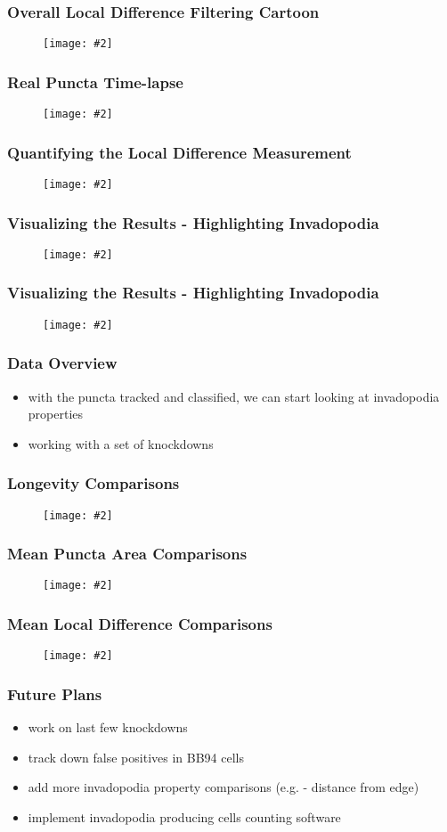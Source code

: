 \documentclass{beamer}
\newcommand{\centerfig}[3]{
	\begin{center}
	\begin{figure}[htbp]
	\texttt{[image: \#2]}
	\\{\tiny #3}
	\end{figure}
	\end{center}
}
\begin{document}
\begin{frame}
	\frametitle{Overall Local Difference Filtering Cartoon}
	\centerfig{width=\textwidth}{figures/sm_puncta/local_diff_filtering_samp50}{}
\end{frame}

\begin{frame}
	\frametitle{Real Puncta Time-lapse}
	\centerfig{width=\textwidth}{figures/sm_puncta/montage_composite}{}
\end{frame}

\begin{frame}
	\frametitle{Quantifying the Local Difference Measurement}
	\centerfig{height=0.8\textheight}{figures/sm_puncta/ctrl_02_23_pos03_0515}{}
\end{frame}

\begin{frame}
	\frametitle{Visualizing the Results - Highlighting Invadopodia}
	\centerfig{height=0.7\textheight}{figures/final_vis/invado_highlight_last_no_high}{}
\end{frame}

\begin{frame}
	\frametitle{Visualizing the Results - Highlighting Invadopodia}
	\centerfig{height=0.7\textheight}{figures/final_vis/invado_highlight_last_highlights}{}
\end{frame}

\begin{frame}
	\frametitle{Data Overview}
	\begin{itemize}
	\item with the puncta tracked and classified, we can start looking at invadopodia properties
	\item working with a set of knockdowns
	\end{itemize}
\end{frame}

\begin{frame}
	\frametitle{Longevity Comparisons}
	\centerfig{width=\textwidth}{figures/data/longevity_barplots}{}
\end{frame}

\begin{frame}
	\frametitle{Mean Puncta Area Comparisons}
	\centerfig{width=\textwidth}{figures/data/area_barplots}{}
\end{frame}

\begin{frame}
	\frametitle{Mean Local Difference Comparisons}
	\centerfig{width=\textwidth}{figures/data/local_diff_means}{}
\end{frame}

\begin{frame}
	\frametitle{Future Plans}
	\begin{itemize}
	\item work on last few knockdowns
	\item track down false positives in BB94 cells
	\item add more invadopodia property comparisons (e.g. - distance from edge)
	\item implement invadopodia producing cells counting software
	\end{itemize}
\end{frame}
\end{document}
